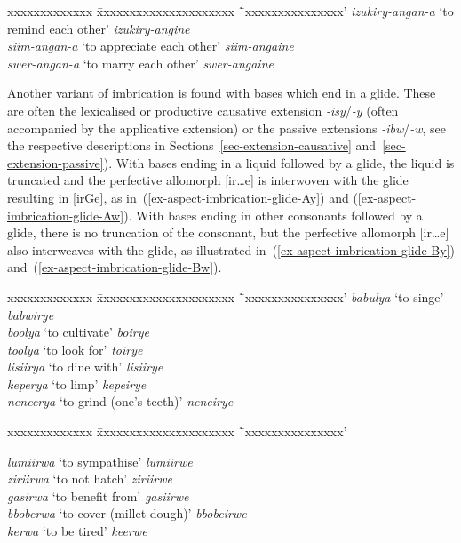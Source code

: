 \ea
\label{ex-aspect-reciprocal-pfv}
\begin{tabbing}
xxxxxxxxxxxxx \= xxxxxxxxxxxxxxxxxxxxx \=`xxxxxxxxxxxxxxx'\kill
\textit{izukiry-angan-a} \>`to remind each other' \> \textit{izukiry-angine}\\
\textit{siim-angan-a} \>`to appreciate each other' \> \textit{siim-angaine}\\
\textit{swer-angan-a} \>`to marry each other' \> \textit{swer-angaine}
\end{tabbing}
\z

Another variant of imbrication is found with bases which end in a glide.  
These are often the lexicalised or productive causative extension \textit{-isy}/\textit{-y} (often accompanied by the applicative extension) or the passive extensions \textit{-ibw}/\textit{-w}, see the respective descriptions in Sections~\ref{sec-extension-causative} and~\ref{sec-extension-passive}). 
With bases ending in a liquid followed by a glide, the liquid is truncated and the perfective allomorph [ir…e] is interwoven with the glide resulting in [irGe], as in~(\ref{ex-aspect-imbrication-glide-Ay}) and (\ref{ex-aspect-imbrication-glide-Aw}). 
With bases ending in other consonants followed by a glide, there is no truncation of the consonant, but the perfective allomorph [ir…e] also interweaves with the glide, as illustrated in~(\ref{ex-aspect-imbrication-glide-By}) and~(\ref{ex-aspect-imbrication-glide-Bw}).

\ea
\label{ex-aspect-imbrication-glide-Ay}
\begin{tabbing}
xxxxxxxxxxxxx \= xxxxxxxxxxxxxxxxxxxxx \=`xxxxxxxxxxxxxxx'\kill
\textit{babulya} \>`to singe' \> \textit{babwirye}\\
\textit{boolya} \>`to cultivate' \> \textit{boirye}\\
\textit{toolya} \>`to look for' \> \textit{toirye}\\
\textit{lisiirya} \>`to dine with' \> \textit{lisiirye}\\
\textit{keperya} \>`to limp' \> \textit{kepeirye}\\
\textit{neneerya} \>`to grind (one's teeth)' \> \textit{neneirye}
\end{tabbing}
\z

\ea
\label{ex-aspect-imbrication-glide-Aw}
\begin{tabbing}
xxxxxxxxxxxxx \= xxxxxxxxxxxxxxxxxxxxx \=`xxxxxxxxxxxxxxx'\kill

\textit{lumiirwa} \>`to sympathise' \> \textit{lumiirwe}\\
\textit{ziriirwa} \>`to not hatch' \> \textit{ziriirwe}\\
\textit{gasirwa} \>`to benefit from' \> \textit{gasiirwe}\\
\textit{bboberwa} \>`to cover (millet dough)' \> \textit{bbobeirwe}\\
\textit{kerwa} \>`to be tired' \> \textit{keerwe}

\end{tabbing}
\z

